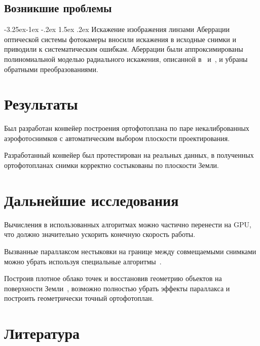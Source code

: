 \documentclass[a4paper,12pt]{article}
\makeatletter
\renewcommand\paragraph{\@startsection{paragraph}{4}{\z@}%
  {-3.25ex\@plus -1ex \@minus -.2ex}%
  {1.5ex \@plus .2ex}%
  {\normalfont\normalsize\bfseries}}
\makeatother
\begin{document}

\subsection{Возникшие проблемы}
\paragraph{Искажение изображения линзами}%
Аберрации оптической системы фотокамеры вносили искажения в исходные снимки 
и приводили к систематическим ошибкам.
Аберрации были аппроксимированы полиномиальной моделью радиального искажения, 
описанной в~\cite{forsythponce04compvis} и~\cite{szelisky10compvis}, 
и убраны обратными преобразованиями.


\section{Результаты}
Был разработан конвейер построения ортофотоплана по паре некалиброванных 
аэрофотоснимков с автоматическим выбором плоскости проектирования. 

Разработанный конвейер был протестирован на реальных данных, в полученных 
ортофотопланах снимки корректно состыкованы по плоскости Земли.

\section{Дальнейшие исследования}

Вычисления в использованных алгоритмах можно частично перенести на GPU, что 
должно значительно ускорить конечную скорость работы.

Вызванные параллаксом нестыковки на границе между совмещаемыми снимками можно
убрать используя специальные алгоритмы~\cite{shum00mosaic, kang04mpps}.

Построив плотное облако точек и восстановив геометрию 
объектов на поверхности Земли~\cite{furu09mvs}, возможно полностью убрать эффекты 
параллакса и построить геометрически точный ортофотоплан.

\section{Литература}
\end{document}
